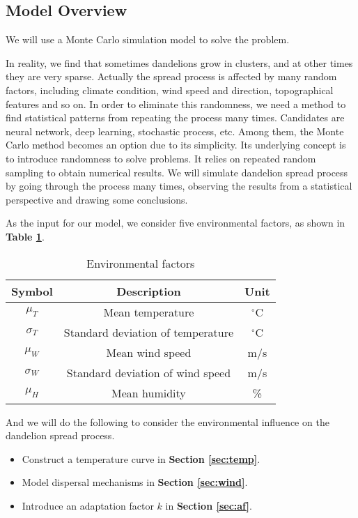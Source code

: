 \documentclass[12pt]{article}
\begin{document}
	
	

	
	\subsection{Model Overview}
		
		We will use a Monte Carlo simulation model to solve the problem.
		
		In reality, we find that sometimes dandelions grow in clusters, and at other times they are very sparse. Actually the spread process is affected by many random factors, including climate condition, wind speed and direction, topographical features and so on.  In order to eliminate this randomness, we need a method to find statistical patterns from repeating the process many times.  Candidates are neural network, deep learning, stochastic process, etc.  Among them, the Monte Carlo method becomes an option due to its simplicity.  Its underlying concept is to introduce randomness to solve problems.   It relies on repeated random sampling to obtain numerical results.  We will simulate dandelion spread process by going through the process many times, observing the results from a statistical perspective and drawing some conclusions.
		
		As the input for our model, we consider five environmental factors, as shown in \textbf{Table \ref{tb:vars}}.  
		
		{
			\fontsize{10}{14}\selectfont
			{
				\begin{longtable}{ccc}
					\caption{Environmental factors}
					\label{tb:vars}\\
					\toprule
					Symbol&Description&Unit\\
					\toprule
					$\mu_T$&Mean temperature&$^\circ$C\\
					$\sigma_T$&Standard deviation of temperature&$^\circ$C\\
					$\mu_W$&Mean wind speed&m/s\\
					$\sigma_W$&Standard deviation of wind speed&m/s\\
					$\mu_H$&Mean humidity&\%\\
					\bottomrule
				\end{longtable}
			}
		}
		
		And we will do the following to consider the environmental influence on the dandelion spread process.
		
		\begin{itemize}
			\vspace{-0.5cm}
			\item Construct a temperature curve in \textbf{Section \ref{sec:temp}}.  
			
			\vspace{-0.2cm}
			\item Model dispersal mechanisms in \textbf{Section \ref{sec:wind}}.
			
			\vspace{-0.2cm}
			\item Introduce an adaptation factor $k$ in \textbf{Section \ref{sec:af}}.  
		
		\end{itemize}
	
\end{document}
